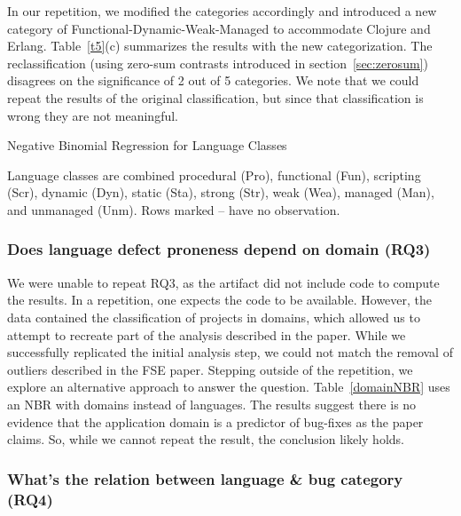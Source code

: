 \documentclass[acmsmall]{acmart}
\newcommand{\clojure}{{\sf  Clojure}\xspace}
\newcommand{\erlang}{{\sf  Erlang}\xspace}
\newcommand{\tabledesc}[1]{\begin{spacing}{.5}{\footnotesize #1}\end{spacing}}
\begin{document}
In our repetition, we modified the categories accordingly and introduced a
new category of {Functional-Dynamic-Weak-Managed} to accommodate \clojure
and \erlang. Table~\ref{t5}(c) summarizes the results with the new
categorization. The reclassification (using zero-sum contrasts introduced in
section~\ref{sec:zerosum}) disagrees on the significance of 2 out of 5
categories.  We note that we could repeat the results of the original
classification, but since that classification is wrong they are not
meaningful.

\begin{table}[h!]\center
\caption{Negative Binomial Regression for Language Classes}
\label{t5}
\medskip \tabledesc{Language classes are combined procedural (Pro),
  functional (Fun), scripting (Scr), dynamic (Dyn), static (Sta), strong
  (Str), weak (Wea), managed (Man), and unmanaged (Unm). Rows marked -- have
  no observation.}
\end{table}


\subsubsection{Does language defect proneness depend on domain (RQ3)}

We were unable to repeat RQ3, as the artifact did not include code to
compute the results. 
In a repetition, one expects the code to be available.
However, the data contained the classification of
projects in domains, which allowed us to attempt to recreate part of the
analysis described in the paper.  While we successfully replicated the
initial analysis step, we could not match the removal of outliers described
in the FSE paper.  Stepping outside of the repetition, we explore an
alternative approach to answer the question.  Table~\ref{domainNBR} uses an
NBR with domains instead of languages. The results suggest there is no
evidence that the application domain is a predictor of bug-fixes as the
paper claims.  So, while we cannot repeat the result, the conclusion
likely holds.


\subsubsection{ What's the relation between language \& bug category (RQ4)}
\end{document}
